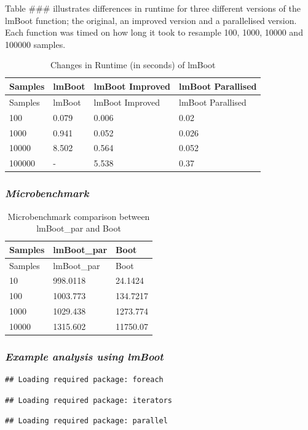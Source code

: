 \documentclass[]{article}
\begin{document}
Table \#\#\# illustrates differences in runtime for three different
versions of the lmBoot function; the original, an improved version and a
parallelised version. Each function was timed on how long it took to
resample 100, 1000, 10000 and 100000 samples.

\begin{longtable}[]{@{}llll@{}}
\caption{Changes in Runtime (in seconds) of lmBoot}\tabularnewline
\toprule
Samples & lmBoot & lmBoot Improved & lmBoot Parallised\tabularnewline
\midrule
\endfirsthead
\toprule
Samples & lmBoot & lmBoot Improved & lmBoot Parallised\tabularnewline
\midrule
\endhead
100 & 0.079 & 0.006 & 0.02\tabularnewline
1000 & 0.941 & 0.052 & 0.026\tabularnewline
10000 & 8.502 & 0.564 & 0.052\tabularnewline
100000 & - & 5.538 & 0.37\tabularnewline
\bottomrule
\end{longtable}

\subsubsection{\texorpdfstring{\emph{Microbenchmark}}{Microbenchmark}}\label{microbenchmark}

\begin{longtable}[]{@{}lll@{}}
\caption{Microbenchmark comparison between lmBoot\_par and
Boot}\tabularnewline
\toprule
Samples & lmBoot\_par & Boot\tabularnewline
\midrule
\endfirsthead
\toprule
Samples & lmBoot\_par & Boot\tabularnewline
\midrule
\endhead
10 & 998.0118 & 24.1424\tabularnewline
100 & 1003.773 & 134.7217\tabularnewline
1000 & 1029.438 & 1273.774\tabularnewline
10000 & 1315.602 & 11750.07\tabularnewline
\bottomrule
\end{longtable}

\subsubsection{\texorpdfstring{\emph{Example analysis using
lmBoot}}{Example analysis using lmBoot}}\label{example-analysis-using-lmboot}

\begin{verbatim}
## Loading required package: foreach
\end{verbatim}

\begin{verbatim}
## Loading required package: iterators
\end{verbatim}

\begin{verbatim}
## Loading required package: parallel
\end{verbatim}
\end{document}
